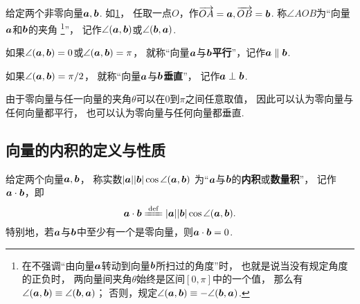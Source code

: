 \begin{definition}
给定两个非零向量\(\boldsymbol{a},\boldsymbol{b}\).
如\cref{figure:解析几何.向量的夹角}，
任取一点\(O\)，作\(\overrightarrow{OA}=\boldsymbol{a},\overrightarrow{OB}=\boldsymbol{b}\).
称\(\angle{AOB}\)为“向量\(\boldsymbol{a}\)和\(\boldsymbol{b}\)的夹角%
\footnote{%
在不强调“由向量\(\boldsymbol{a}\)转动到向量\(\boldsymbol{b}\)所扫过的角度”时，%
也就是说当没有规定角度的正负时，%
两向量间夹角\(\theta\)始终是区间\([0,\pi]\)中的一个值，%
那么有\(\angle(\boldsymbol{a},\boldsymbol{b}) \equiv \angle(\boldsymbol{b},\boldsymbol{a})\)；%
否则，规定\(\angle(\boldsymbol{a},\boldsymbol{b}) \equiv -\angle(\boldsymbol{b},\boldsymbol{a})\).%
}”，%
记作\(\angle(\boldsymbol{a},\boldsymbol{b})\)或\(\angle(\boldsymbol{b},\boldsymbol{a})\).

\begin{figure}[ht]
\centering
{}
\caption{}
\label{figure:解析几何.向量的夹角}
\end{figure}

如果\(\angle(\boldsymbol{a},\boldsymbol{b}) = 0\)或\(\angle(\boldsymbol{a},\boldsymbol{b}) = \pi\)，%
就称“向量\(\boldsymbol{a}\)与\(\boldsymbol{b}\)\textbf{平行}”，记作\(\boldsymbol{a}\parallel\boldsymbol{b}\).

如果\(\angle(\boldsymbol{a},\boldsymbol{b}) = \pi/2\)，%
就称“向量\(\boldsymbol{a}\)与\(\boldsymbol{b}\)\textbf{垂直}”，%
记作\(\boldsymbol{a}\perp\boldsymbol{b}\).
\end{definition}

由于零向量与任一向量的夹角\(\theta\)可以在\(0\)到\(\pi\)之间任意取值，%
因此可以认为零向量与任何向量都平行，%
也可以认为零向量与任何向量都垂直.

\subsection{向量的内积的定义与性质}
\begin{definition}
给定两个向量\(\boldsymbol{a},\boldsymbol{b}\)，
称实数\(\abs{\boldsymbol{a}} \abs{\boldsymbol{b}} \cos\angle(\boldsymbol{a},\boldsymbol{b})\)
为“\(\boldsymbol{a}\)与\(\boldsymbol{b}\)的\textbf{内积}或\textbf{数量积}”，
记作\(\boldsymbol{a} \cdot \boldsymbol{b}\)，即
\begin{equation}
	\mat{a} \cdot \mat{b}
	\defeq
	\abs{\mat{a}} \abs{\mat{b}} \cos\angle(\mat{a},\mat{b}).
\end{equation}
特别地，若\(\boldsymbol{a}\)与\(\boldsymbol{b}\)中至少有一个是零向量，则\(\boldsymbol{a}\cdot\boldsymbol{b}=0\).
\end{definition}

